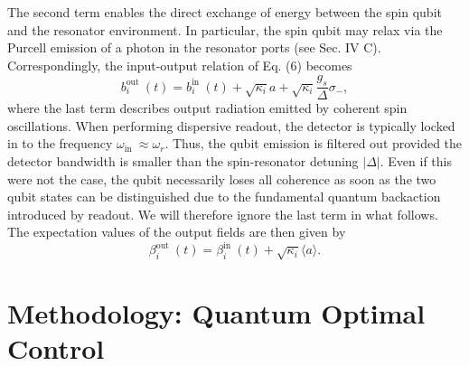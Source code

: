 \documentclass[12pt]{article}
\begin{document}
The second term enables the direct exchange of energy between the spin qubit and the resonator environment. In particular, the spin qubit may relax via the Purcell emission of a photon in the resonator ports (see Sec. IV C). Correspondingly, the input-output relation of Eq. (6) becomes
$$
b_i^{\text {out }}(t)=b_i^{\text {in }}(t)+\sqrt{\kappa_i} a+\sqrt{\kappa_i} \frac{g_s}{\Delta} \sigma_{-},
$$
where the last term describes output radiation emitted by coherent spin oscillations. When performing dispersive readout, the detector is typically locked in to the frequency $\omega_{\text {in }} \approx \omega_r$. Thus, the qubit emission is filtered out provided the detector bandwidth is smaller than the spin-resonator detuning $|\Delta|$. Even if this were not the case, the qubit necessarily loses all coherence as soon as the two qubit states can be distinguished due to the fundamental quantum backaction introduced by readout. We will therefore ignore the last term in what follows. The expectation values of the output fields are then given by
$$
\beta_i^{\text {out }}(t)=\beta_i^{\text {in }}(t)+\sqrt{\kappa_i}\langle a\rangle .
$$
\section{Methodology: Quantum Optimal Control}
\end{document}
